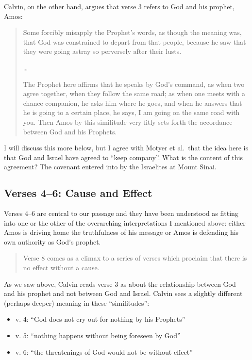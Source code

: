 Calvin, on the other hand, argues that verse 3 refers to God and his prophet,
Amos:

\begin{quote}
    Some forcibly misapply the Prophet's words, as though the meaning was, that
    God was constrained to depart from that people, because he saw that they
    were going astray so perversely after their lusts.

    \dots

    The Prophet here affirms that he speaks by God's command, as when two agree
    together, when they follow the same road; as when one meets with a chance
    companion, he asks him where he goes, and when he answers that he is going
    to a certain place, he says, I am going on the same road with you. Then Amos
    by this similitude very fitly sets forth the accordance between God and his
    Prophets.
    \autocite[204-205]{calvin+owen:1986}
\end{quote}

I will discuss this more below, but I agree with Motyer et al.\ that the idea
here is that God and Israel have agreed to \enquote{keep company}. What is the
content of this agreement? The covenant entered into by the Israelites at Mount
Sinai.

\subsection{Verses 4--6: Cause and Effect}

Verses 4--6 are central to our passage and they have been understood as fitting
into one or the other of the overarching interpretations I mentioned above:
either Amos is driving home the truthfulness of his message or Amos is defending
his own authority as God's prophet. 

\begin{quote}
    Verse 8 comes as a climax to a series of verses which proclaim that
    there is no effect without a cause.
    \autocite[75]{motyer:1974}
\end{quote}

As we saw above, Calvin reads verse 3 as about the relationship between God and
his prophet and not between God and Israel. Calvin sees a slightly different
(perhaps deeper) meaning in these \enquote{similitudes}:

\begin{itemize}
    \item v. 4: \enquote{God does not cry out for nothing by his Prophets}
    \item v. 5: \enquote{nothing happens without being foreseen by God}
    \item v. 6: \enquote{the threatenings of God would not be without effect}
        \autocite[206-207]{calvin+owen:1986}
\end{itemize}

